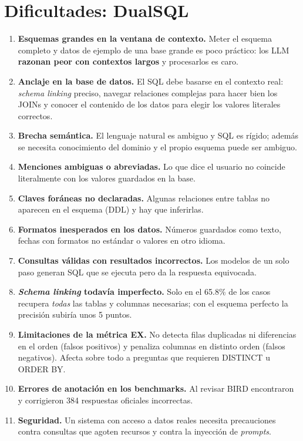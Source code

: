 \documentclass[11pt,a4paper]{article}
\begin{document}
\section{Dificultades: DualSQL}
\begin{enumerate}
  \item \textbf{Esquemas grandes en la ventana de contexto.} Meter el esquema completo y datos de ejemplo de una base grande es poco práctico: los LLM \textbf{razonan peor con contextos largos} y procesarlos es caro.
  \item \textbf{Anclaje en la base de datos.} El SQL debe basarse en el contexto real: \textit{schema linking} preciso, navegar relaciones complejas para hacer bien los JOINs y conocer el contenido de los datos para elegir los valores literales correctos.
  \item \textbf{Brecha semántica.} El lenguaje natural es ambiguo y SQL es rígido; además se necesita conocimiento del dominio y el propio esquema puede ser ambiguo.
  \item \textbf{Menciones ambiguas o abreviadas.} Lo que dice el usuario no coincide literalmente con los valores guardados en la base.
  \item \textbf{Claves foráneas no declaradas.} Algunas relaciones entre tablas no aparecen en el esquema (DDL) y hay que inferirlas.
  \item \textbf{Formatos inesperados en los datos.} Números guardados como texto, fechas con formatos no estándar o valores en otro idioma.
  \item \textbf{Consultas válidas con resultados incorrectos.} Los modelos de un solo paso generan SQL que se ejecuta pero da la respuesta equivocada.
  \item \textbf{\textit{Schema linking} todavía imperfecto.} Solo en el 65.8\% de los casos recupera \textit{todas} las tablas y columnas necesarias; con el esquema perfecto la precisión subiría unos 5 puntos.
  \item \textbf{Limitaciones de la métrica EX.} No detecta filas duplicadas ni diferencias en el orden (falsos positivos) y penaliza columnas en distinto orden (falsos negativos). Afecta sobre todo a preguntas que requieren DISTINCT u ORDER BY.
  \item \textbf{Errores de anotación en los benchmarks.} Al revisar BIRD encontraron y corrigieron 384 respuestas oficiales incorrectas.
  \item \textbf{Seguridad.} Un sistema con acceso a datos reales necesita precauciones contra consultas que agoten recursos y contra la inyección de \textit{prompts}.
\end{enumerate}
\end{document}
